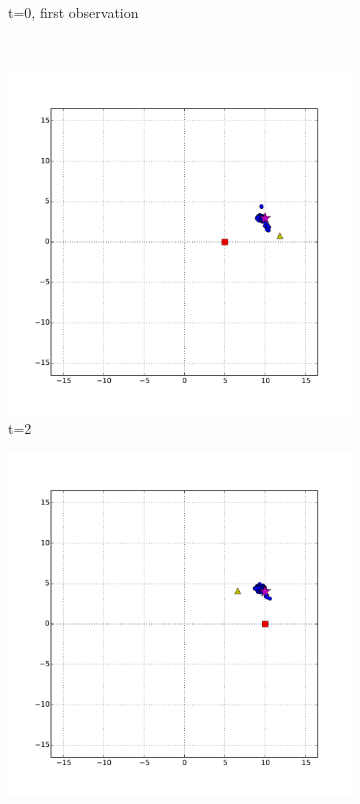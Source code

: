 \begin{figure}
\begin{subfigure}[b]{0.3\textwidth}
                \caption{t=0, first observation}
                \label{fig:bad_heading_t_0}
        \end{subfigure}
        ~ %
        \begin{subfigure}[b]{0.3\textwidth}
                \includegraphics[width=\textwidth]{bad_heading_t_2}
                \caption{t=2}
                \label{fig:bad_heading_t_2}
        \end{subfigure}
        \begin{subfigure}[b]{0.3\textwidth}
                \includegraphics[width=\textwidth]{bad_heading_t_3}

\end{subfigure}
\end{figure}
